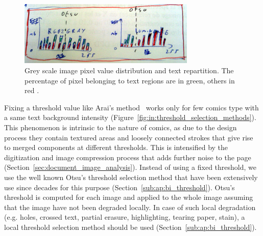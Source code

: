 	\begin{figure}[h!]	%
	  \centering
		\includegraphics[trim= 0px 0px 0px 0px, clip, width=0.75\textwidth]{threshold_selection_methods.jpg}
		\caption[Grey scale image pixel value distribution for text and non text region]{Grey scale image pixel value distribution and text repartition. The percentage of pixel belonging to text regions are in green, others in red .}
		\label{fig:in:greyscale_text_pixel_distribution}
	\end{figure}

Fixing a threshold value like Arai's method~\cite{Arai11} works only for few comics type with a same text background intensity (Figure~\ref{fig:in:threshold_selection_methods}).
This phenomenon is intrinsic to the nature of comics, as due to the design process they contain textured areas and loosely connected strokes that give rise to merged components at different thresholds.
This is intensified by the digitization and image compression process that adds further noise to the page (Section~\ref{sec:document_image_analysis}).
Instead of using a fixed threshold, we use the well known Otsu's threshold selection method that have been extensively use since decades for this purpose (Section~\ref{sub:ap:bi_threshold}).
Otsu's threshold is computed for each image and applied to the whole image assuming that the image have not been degraded locally.
In case of such local degradation (e.g. holes, crossed text, partial erasure, highlighting, tearing paper, stain), a local threshold selection method should be used (Section~\ref{sub:ap:bi_threshold}).


